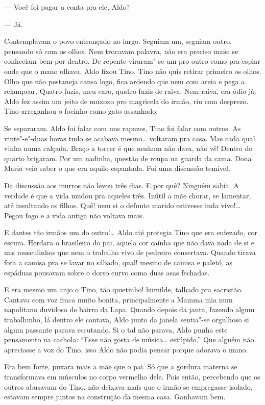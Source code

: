 --- Você foi pagar a conta pra ele, Aldo?

--- Já.

Contemplavam o povo entrançado no largo. Seguiam um, seguiam outro,
pensando só com os olhos. Nem trocavam palavra, não era preciso mais: se
conheciam bem por dentro. De repente viraram"-se um pro outro como pra
espiar onde que o mano olhava. Aldo fixou Tino. Tino não quis retirar
primeiro os olhos. Olho que não pestaneja cansa logo, fica ardendo que
nem com areia e pega a relampear. Quatro fuzis, meu caro, quatro fuzis
de raiva. Nem raiva, era ódio já. Aldo fez assim um jeito de muxoxo pro
magricela do irmão, riu com desprezo. Tino arreganhou o focinho como
gato assanhado. 

Se separaram. Aldo foi falar com uns rapazes, Tino foi falar com outros.
As vinte"-e"-duas horas tudo se acabava mesmo\ldots{} voltaram pra casa. Mas
cada qual vinha numa calçada. Braço a torcer é que nenhum não dava, não
vê! Dentro do quarto brigaram. Por um nadinha, questão de roupa na
guarda da cama. Dona Maria veio saber o que era aquilo espantada. Foi
uma discussão temível.

Da discussão aos murros não levou três dias. E por quê? Ninguém sabia. A
verdade é que a vida mudou pra aqueles três. Inútil a mãe chorar, se
lamentar, até insultando os filhos. Quê! nem si o defunto marido
estivesse inda vivo!\ldots{} Pegou fogo e a vida antiga não voltava mais.

E dantes tão irmãos um do outro!\ldots{} Aldo até protegia Tino que era
enfezado, cor escura. Herdara o brasileiro do pai, aquela cor caínha que
não dava nada de si e uns musculinhos que nem o trabalho vivo de
pedreiro consertava. Quando tirava fora a camisa pra se lavar no sábado,
qual! mesmo de camisa e paletó, as espáduas pousavam sobre o dorso curvo
como duas asas fechadas.

E era mesmo um anjo o Tino, tão quietinho! humilde, talhado pra
sacristão. Cantava com voz fraca muito bonita, principalmente a Mamma
mia num napolitano duvidoso de bairro da Lapa. Quando depois da janta,
fazendo algum trabalhinho, lá dentro ele cantava, Aldo junto da janela
sentia"-se orgulhoso si algum passante parava escutando. Si o tal não
parava, Aldo punha este pensamento na cachola: ``Esse não gosta de
música\ldots{} estúpido.'' Que alguém não apreciasse a voz do Tino, isso Aldo
não podia pensar porque adorava o mano.

Era bem forte, puxara mais a mãe que o pai. Só que a gordura materna se
transformava em músculos no corpo vermelho dele. Pois então, percebendo
que os outros abusavam do Tino, não deixava mais que o irmão se
empregasse isolado, estavam sempre juntos na construção da mesma casa.
Ganhavam bem. 


